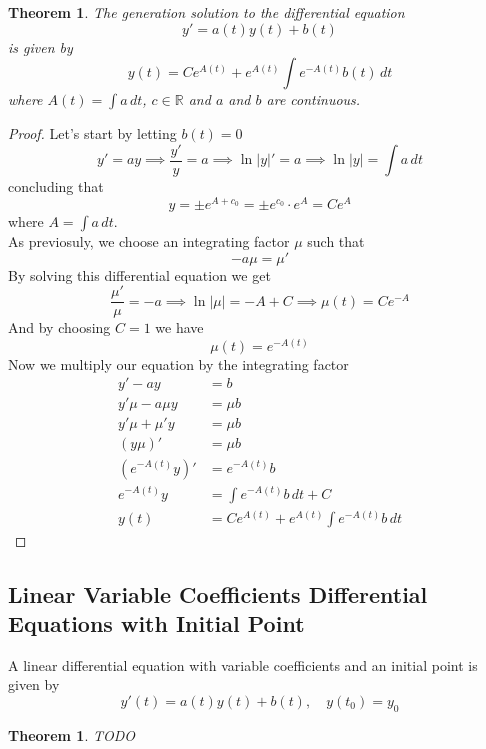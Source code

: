 \documentclass{article}
\newtheorem*{theorem3}{Theorem}
\newtheorem*{theorem4}{Theorem}
\begin{document}
\begin{theorem3}
    The generation solution to the differential equation
    \[
        y' = a(t)y(t) + b(t)
    \]
    is given by
    \[
        y(t)=Ce^{A(t)} + e^{A(t)} \int e^{-A(t)} b(t)\, dt
    \]
    where \(A(t)=\int a\,dt\), \(c\in\mathbb{R}\) and \(a\) and \(b\) are
    continuous.
\end{theorem3}
\begin{proof}
    Let's start by letting \(b(t)=0\)
    \[
        y' = ay
        \implies
        \frac{y'}{y}=a
        \implies
        \ln|y|'=a
        \implies
        \ln|y|=\int a\,dt
    \]
    concluding that
    \[
        y = \pm e^{A+c_0}=\pm e^{c_0} \cdot e^{A} = Ce^A
    \]
    where \(A=\int a\, dt\).
    \\
    As previosuly, we choose an integrating factor \(\mu\) such that
    \[
        -a\mu = \mu'
    \]
    By solving this differential equation we get
    \[
        \frac{\mu'}{\mu} = -a
        \implies
        \ln|\mu| = -A+C
        \implies
        \mu(t) = Ce^{-A}
    \]
    And by choosing \(C=1\) we have
    \[
        \mu(t) = e^{-A(t)}
    \]
    Now we multiply our equation by the integrating factor
    \begin{align*}
        y' - ay &= b \\
        y'\mu - a\mu y &= \mu b \\
        y' \mu + \mu' y &= \mu b \\
        \left(y \mu\right)' &= \mu b \\
        \left(e^{-A(t)}y\right)' &= e^{-A(t)}b \\
        e^{-A(t)}y &= \int e^{-A(t)}b \,dt + C \\
        y(t) &= Ce^{A(t)} + e^{A(t)} \int e^{-A(t)}b \,dt
    \end{align*}
\end{proof}

\subsection{Linear Variable Coefficients Differential Equations with Initial Point}

A linear differential equation with variable coefficients and an initial point is given by
\[
    y'(t) = a(t)y(t) + b(t), \quad
    y(t_0) = y_0
\]

\begin{theorem4}
    TODO %
\end{theorem4}
\end{document}
